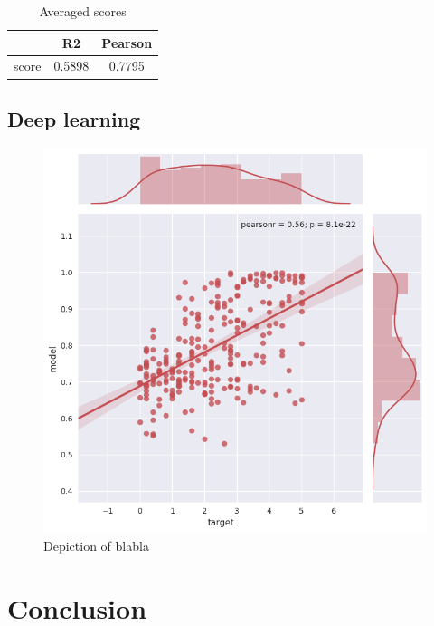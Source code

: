 \documentclass[10pt, a4paper]{article}
\begin{document}
\begin{table}
\caption{Averaged scores}
\label{tab:narrow-table}
\begin{center}
\begin{tabular}{ccc}
\toprule
& R2 & Pearson\\
\midrule
score & 0.5898 & 0.7795 \\
\bottomrule
\end{tabular}
\end{center}
\end{table}

\subsection{Deep learning}


\newpage
\begin{figure}
\begin{center}
\includegraphics[width=\columnwidth]{only_2nd_layer.png}
\caption{Depiction of blabla}
\label{fig:lstm_2nd_layer}
\end{center}
\end{figure}



\section{Conclusion}



\nocite{*}
\end{document}
